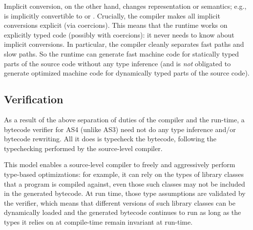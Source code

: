 Implicit conversion, on the other hand,
changes representation or semantics;
	e.g.,  is implicitly convertible to  or
        \code{*}. Crucially, the
	compiler makes all implicit conversions explicit (via
        coercions). This means that the
	runtime works on explicitly typed code (possibly with
        coercions): it never needs to know about implicit conversions.
In particular, the compiler cleanly separates fast paths and slow paths.
So the runtime can generate fast machine code for statically typed parts
        of the source code without any type inference (and is \emph{not} obligated to
        generate optimized machine code for dynamically typed parts of the
        source code).

\subsection{Verification}

As a result of the above separation of duties of the compiler and the
run-time, a bytecode verifier for AS4 (unlike AS3) need not do any
type inference and/or bytecode rewriting. All it does is typecheck the
bytecode, following the typechecking performed by the source-level
compiler.

This model enables a source-level compiler to freely and aggressively perform
type-based optimizations: for example, it can rely on the types of
library classes that a program is compiled against, even those such
classes may not be included in the generated bytecode. At run time,
those type assumptions are validated by the verifier, which means that
different versions of such library classes can be dynamically loaded
and the generated bytecode continues to run as long as the types it
relies on at compile-time remain invariant at run-time.
